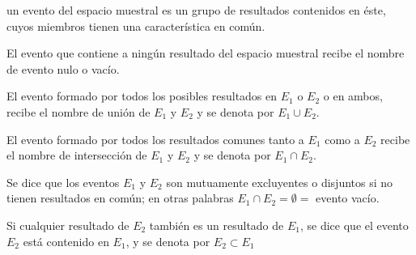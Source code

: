 \begin{tcolorbox}[colframe = white]
    \begin{def.} un evento del espacio muestral es un grupo de resultados contenidos en éste, cuyos miembros tienen una característica en común.
    \end{def.}
\end{tcolorbox}

\begin{tcolorbox}[colframe = white]
    \begin{def.} El evento que contiene a ningún resultado del espacio muestral recibe el nombre de evento nulo o vacío.
    \end{def.}
\end{tcolorbox}

\begin{tcolorbox}[colframe = white]
    \begin{def.} El evento formado por todos los posibles resultados en $E_1$ o $E_2$ o en ambos, recibe el nombre de unión de $E_1$ y $E_2$ y se denota por $E_1 \cup E_2$.
    \end{def.}
\end{tcolorbox}

\begin{tcolorbox}[colframe = white]
    \begin{def.} El evento formado por todos los resultados comunes tanto a $E_1$ como a $E_2$ recibe el nombre de intersección de $E_1$ y $E_2$ y se denota por $E_1 \cap E_2$.
    \end{def.}
\end{tcolorbox}

\begin{tcolorbox}[colframe = white]
    \begin{def.} Se dice que los eventos $E_1$ y $E_2$ son mutuamente excluyentes o disjuntos si no tienen resultados en común; en otras palabras $E_1 \cap E_2 =\emptyset = $ evento vacío.
    \end{def.}
\end{tcolorbox}

\begin{tcolorbox}[colframe = white]
    \begin{def.} Si cualquier resultado de $E_2$ también es un resultado de $E_1$, se dice que el evento $E_2$ está contenido en $E_1$, y se denota por $E_2 \subset E_1$ 
    \end{def.}
\end{tcolorbox}

